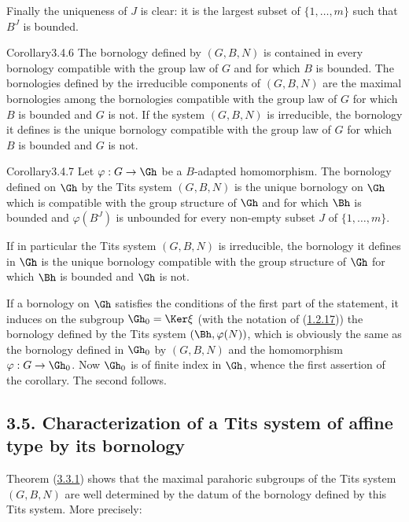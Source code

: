 \documentclass[12pt,a4paper,oneside,english]{smfart}
\makeatletter
\newcommand{\btanchor}[1]{\leavevmode\Hy@raisedlink{\hypertarget{bt:#1}{}}}
\newcommand{\btref}[1]{\hyperlink{bt:#1}{#1}}
\newcommand{\btsecB}[2]{%
  \par\needspace{4\baselineskip}\phantomsection
  \subsection*{#2}%
  \ifx\relax#1\relax\else\btanchor{#1}\fi}
\theoremstyle{definition}
\theoremstyle{bt}
\makeatother
\begin{document}
Finally the uniqueness of $J$ is clear: it is the largest subset of
$\{1,\dots,m\}$ such that $B^{J}$ is bounded.

\begin{state}{Corollary}{3.4.6}\btanchor{3.4.6}
The bornology defined by $(G,B,N)$ is contained in every bornology compatible
with the group law of $G$ and for which $B$ is bounded. The bornologies
defined by the irreducible components of $(G,B,N)$ are the maximal
bornologies among the bornologies compatible with the group law of $G$ for
which $B$ is bounded and $G$ is not. If the system $(G,B,N)$ is irreducible,
the bornology it defines is the unique bornology compatible with the group
law of $G$ for which $B$ is bounded and $G$ is not.
\end{state}

\begin{state}{Corollary}{3.4.7}\btanchor{3.4.7}
Let $\varphi : G \to \Gh$ be a $B$-adapted homomorphism. The bornology
defined on $\Gh$ by the Tits system $(G,B,N)$ is the unique bornology on
$\Gh$ which is compatible with the group structure of $\Gh$ and for which
$\Bh$ is bounded and $\varphi(B^{J})$ is unbounded for every non-empty subset
$J$ of $\{1,\dots,m\}$.

If in particular the Tits system $(G,B,N)$ is irreducible, the bornology it
defines in $\Gh$ is the unique bornology compatible with the group structure
of $\Gh$ for which $\Bh$ is bounded and $\Gh$ is not.
\end{state}

If a bornology on $\Gh$ satisfies the conditions of the first part of the
statement, it induces on the subgroup $\Gh_0 = \Ker\xi$ (with the notation of
(\btref{1.2.17})) the bornology defined by the Tits system $(\Bh, \varphi(N))$, which
is obviously the same as the bornology defined in $\Gh_0$ by $(G,B,N)$ and
the homomorphism $\varphi : G \to \Gh_0$. Now $\Gh_0$ is of finite index in
$\Gh$, whence the first assertion of the corollary. The second follows.


\btsecB{3.5}{3.5. Characterization of a Tits system of affine type by its bornology}


Theorem (\btref{3.3.1}) shows that the maximal parahoric subgroups of the Tits system
$(G,B,N)$ are well determined by the datum of the bornology defined by this
Tits system. More precisely:
\end{document}
